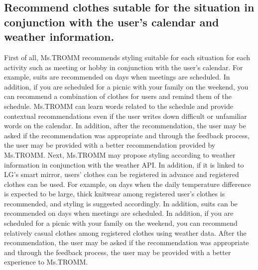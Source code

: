 \documentclass[conference]{IEEEtran}
\begin{document}
\subsection{Recommend clothes sutable for the situation in conjunction with the user’s calendar and weather information.}
First of all, Ms.TROMM recommends styling suitable for each situation for each activity such as meeting or hobby in conjunction with the user's calendar. For example, suits are recommended on days when meetings are scheduled. In addition, if you are scheduled for a picnic with your family on the weekend, you can recommend a combination of clothes for users and remind them of the schedule. Ms.TROMM can learn words related to the schedule and provide contextual recommendations even if the user writes down difficult or unfamiliar words on the calendar. In addition, after the recommendation, the user may be asked if the recommendation was appropriate and through the feedback process, the user may be provided with a better recommendation provided by Ms.TROMM.
Next, Ms.TROMM may propose styling according to weather information in conjunction with the weather API. In addition, if it is linked to LG's smart mirror, users' clothes can be registered in advance and registered clothes can be used. For example, on days when the daily temperature difference is expected to be large, thick knitwear among registered user's clothes is recommended, and styling is suggested accordingly. In addition, suits can be recommended on days when meetings are scheduled. In addition, if you are scheduled for a picnic with your family on the weekend, you can recommend relatively casual clothes among registered clothes using weather data. After the recommendation, the user may be asked if the recommendation was appropriate and through the feedback process, the user may be provided with a better experience to Ms.TROMM.\\
\end{document}
